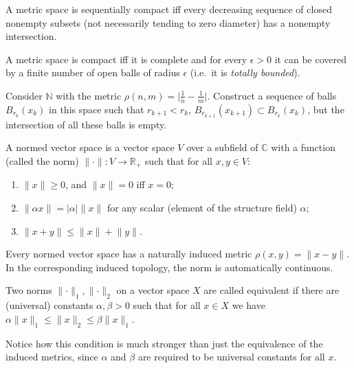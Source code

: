 \begin{prop}
    A metric space is sequentially compact iff every decreasing sequence of closed nonempty subsets (not necessarily tending to zero diameter) has a nonempty intersection.
\end{prop}


\begin{thm}
    A metric space is compact iff it is complete and for every $\epsilon>0$ it can be covered by a finite number of open balls of radius $\epsilon$ (i.e.~it is \emph{totally bounded}).
\end{thm}


\begin{xca}
Consider $\mathbb{N}$ with the metric $\rho (n,m)=\lvert \frac 1 n-\frac 1 m\rvert$. Construct a sequence of balls $B_{r_k}(x_k)$ in this space such that $r_{k+1}<r_k$, $B_{r_{k+1}}(x_{k+1})\subset B_{r_k}(x_k)$, but the intersection of all these balls is empty.
\end{xca}
\begin{defn}
A normed vector space is a vector space $V$ over a subfield of $\mathbb{C}$ with a function (called the norm) $\lVert \cdot \rVert: V\to \mathbb{R}_+$ such that for all $x,y\in V$:
\begin{enumerate}
    \item $\lVert x\rVert\geq 0$, and $\lVert x\rVert= 0$ iff $x=0$;
    \item $\lVert \alpha  x\rVert=\lvert \alpha \rvert \lVert x\rVert$ for any scalar (element of the structure field) $\alpha$;
    \item $\lVert x+y\rVert\leq \lVert x\rVert+\lVert y\rVert$.
\end{enumerate}
Every normed vector space has a naturally induced metric $\rho (x,y)=\lVert x-y\rVert$. In the corresponding induced topology, the norm is automatically continuous.

\end{defn}
\begin{defn}
Two norms $\lVert\cdot \rVert_1,\lVert\cdot \rVert_2 $ on a vector space $X$ are called equivalent if there are (universal) constants $\alpha,\beta >0$ such that for all $x\in X$ we have $\alpha \lVert x \rVert_1\leq \lVert x \rVert_2 \leq \beta \lVert x \rVert_1$.
\end{defn}
Notice how this condition is much stronger than just the equivalence of the induced metrics, since $\alpha$ and $\beta$ are required to be universal constants for all $x$.

